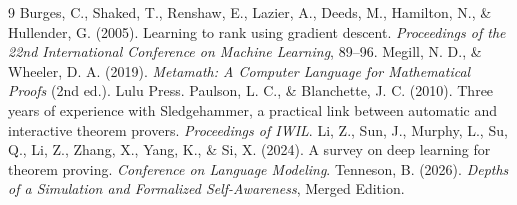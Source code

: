 \documentclass[11pt]{article}
\theoremstyle{plain}
\theoremstyle{definition}
\theoremstyle{remark}
\begin{document}
\begin{thebibliography}{9}
 Burges, C., Shaked, T., Renshaw, E., Lazier, A., Deeds, M.,
Hamilton, N., \& Hullender, G. (2005). Learning to rank using gradient descent.
\textit{Proceedings of the 22nd International Conference on Machine Learning},
89--96.
 Megill, N. D., \& Wheeler, D. A. (2019). \textit{Metamath: A
Computer Language for Mathematical Proofs} (2nd ed.). Lulu Press.
 Paulson, L. C., \& Blanchette, J. C. (2010). Three years
of experience with Sledgehammer, a practical link between automatic and
interactive theorem provers. \textit{Proceedings of IWIL}.
 Li, Z., Sun, J., Murphy, L., Su, Q., Li, Z., Zhang, X., Yang,
K., \& Si, X. (2024). A survey on deep learning for theorem proving.
\textit{Conference on Language Modeling}.
 Tenneson, B. (2026). \textit{Depths of a Simulation and
Formalized Self-Awareness}, Merged Edition.
\end{thebibliography}
\end{document}
